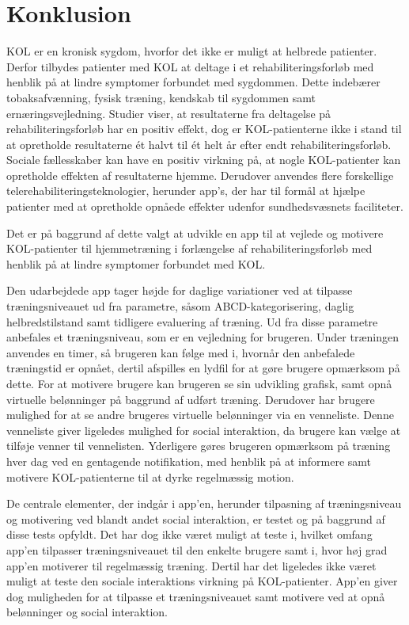 \section{Konklusion}
KOL er en kronisk sygdom, hvorfor det ikke er muligt at helbrede patienter. Derfor tilbydes patienter med KOL at deltage i et rehabiliteringsforløb med henblik på at lindre symptomer forbundet med sygdommen. Dette indebærer tobaksafvænning, fysisk træning, kendskab til sygdommen samt ernæringsvejledning. Studier viser, at resultaterne fra deltagelse på rehabiliteringsforløb har en positiv effekt, dog er KOL-patienterne ikke i stand til at opretholde resultaterne ét halvt til ét helt år efter endt rehabiliteringsforløb. Sociale fællesskaber kan have en positiv virkning på, at nogle KOL-patienter kan opretholde effekten af resultaterne hjemme. Derudover anvendes flere forskellige telerehabiliteringsteknologier, herunder app’s, der har til formål at hjælpe patienter med at opretholde opnåede effekter udenfor sundhedsvæsnets faciliteter. 

Det er på baggrund af dette valgt at udvikle en app til at vejlede og motivere KOL-patienter til hjemmetræning i forlængelse af rehabiliteringsforløb med henblik på at lindre symptomer forbundet med KOL.

Den udarbejdede app tager højde for daglige variationer ved at tilpasse træningsniveauet ud fra parametre, såsom ABCD-kategorisering, daglig helbredstilstand samt tidligere evaluering af træning. Ud fra disse parametre anbefales et træningsniveau, som er en vejledning for brugeren. Under træningen anvendes en timer, så brugeren kan følge med i, hvornår den anbefalede træningstid er opnået, dertil afspilles en lydfil for at gøre brugere opmærksom på dette. For at motivere brugere kan brugeren se sin udvikling grafisk, samt opnå virtuelle belønninger på baggrund af udført træning. Derudover har brugere mulighed for at se andre brugeres virtuelle belønninger via en venneliste. Denne venneliste giver ligeledes mulighed for social interaktion, da brugere kan vælge at tilføje venner til vennelisten. Yderligere gøres brugeren opmærksom på træning hver dag ved en gentagende notifikation, med henblik på at informere samt motivere KOL-patienterne til at dyrke regelmæssig motion.  

De centrale elementer, der indgår i app’en, herunder tilpasning af træningsniveau og motivering ved blandt andet social interaktion, er testet og på baggrund af disse tests opfyldt. Det har dog ikke været muligt at teste i, hvilket omfang app'en tilpasser træningsniveauet til den enkelte brugere samt i, hvor høj grad app'en motiverer til regelmæssig træning. Dertil har det ligeledes ikke været muligt at teste den sociale interaktions virkning på KOL-patienter. App’en giver dog muligheden for at tilpasse et træningsniveauet samt motivere ved at opnå belønninger og social interaktion. 

